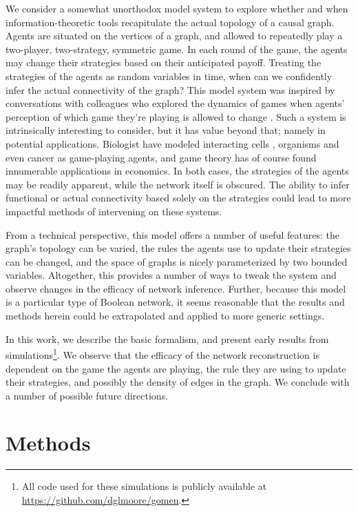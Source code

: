 \documentclass[letterpaper]{article}
\begin{document}
We consider a somewhat unorthodox model system to explore whether and when information-theoretic tools recapitulate the actual topology of a causal graph. Agents are situated on the vertices of a graph, and allowed to repeatedly play a two-player, two-strategy, symmetric game. In each round of the game, the agents may change their strategies based on their anticipated payoff. Treating the strategies of the agents as random variables in time, when can we confidently infer the actual connectivity of the graph? This model system was inspired by conversations with colleagues who explored the dynamics of games when agents' perception of which game they're playing is allowed to change \citep{Antonioni2018-cc}. Such a system is intrinsically interesting to consider, but it has value beyond that; namely in potential applications. Biologist have modeled interacting cells \citep{Hummert2014-gz}, organisms \citep{Smith_John_Maynard1979-hr, Smith1982-le, S_E_Riechert2003-bg, Nowak2004-rq} and even cancer \citep{Bach2001-vs,Gatenby2003-ha,Basanta2008-ta,Dingli2009-bd} as game-playing agents, and game theory has of course found innumerable applications in economics. In both cases, the strategies of the agents may be readily apparent, while the network itself is obscured. The ability to infer functional or actual connectivity based solely on the strategies could lead to more impactful methods of intervening on these systems.

From a technical perspective, this model offers a number of useful features: the graph's topology can be varied, the rules the agents use to update their strategies can be changed, and the space of graphs is nicely parameterized by two bounded variables. Altogether, this provides a number of ways to tweak the system and observe changes in the efficacy of network inference. Further, because this model is a particular type of Boolean network, it seems reasonable that the results and methods herein could be extrapolated and applied to more generic settings.

In this work, we describe the basic formalism, and present early results from simulations\footnote{All code used for these simulations is publicly available at \url{https://github.com/dglmoore/gomen}.}. We observe that the efficacy of the network reconstruction is dependent on the game the agents are playing, the rule they are using to update their strategies, and possibly the density of edges in the graph. We conclude with a number of possible future directions.

\section{Methods}
\label{sec:methods}
\end{document}
